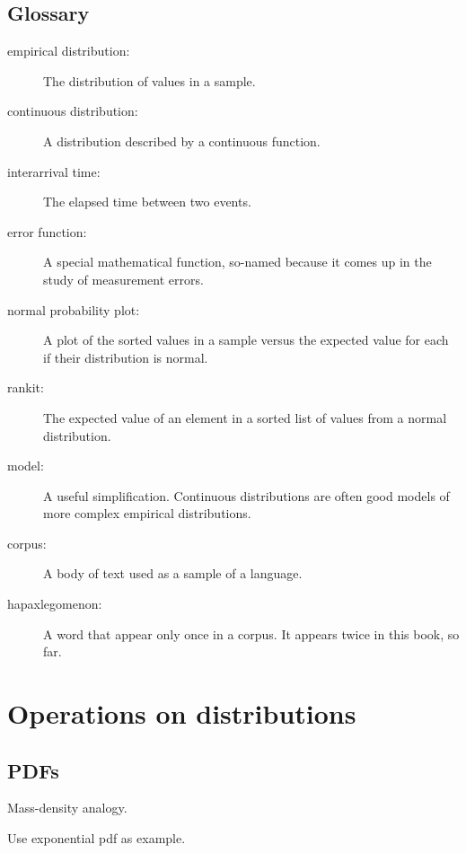 \documentclass[12pt]{book}
\begin{document}
\section{Glossary}

\begin{description}

\item[empirical distribution:] The distribution of values in a sample.

\item[continuous distribution:] A distribution described by a continuous
function.

\item[interarrival time:] The elapsed time between two events.

\item[error function:] A special mathematical function, so-named
  because it comes up in the study of measurement errors.

\item[normal probability plot:] A plot of the sorted values in a sample
versus the expected value for each if their distribution is normal.

\item[rankit:] The expected value of an element in a sorted list of
values from a normal distribution.

\item[model:] A useful simplification.  Continuous distributions are
often good models of more complex empirical distributions.

\item[corpus:] A body of text used as a sample of a language.

\item[hapaxlegomenon:] A word that appear only once in a corpus.
It appears twice in this book, so far.

\end{description}


\chapter{Operations on distributions}


\section{PDFs}

Mass-density analogy.

Use exponential pdf as example.
\end{document}
